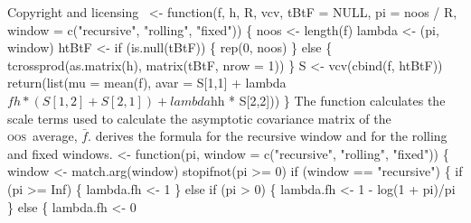 \documentclass[10pt]{article}%
\newcommand{\oos}{\textsc{oos}}
\begin{document}
\endmoddef\nwstartdeflinemarkup{}\nwenddeflinemarkup
\LA{}Copyright and licensing~{\nwtagstyle{}}\RA{}
 <- function(f, h, R, vcv, tBtF = NULL, pi = noos / R,
                            window = c("recursive", "rolling", "fixed")) \{
  noos <- length(f)
  lambda <- (pi, window)
  htBtF <- if (is.null(tBtF)) \{
    rep(0, noos) 
  \} else \{
    tcrossprod(as.matrix(h), matrix(tBtF, nrow = 1))
  \}
  S <- vcv(cbind(f, htBtF))
  return(list(mu = mean(f), avar = S[1,1] + lambda$fh * (S[1,2] + S[2,1]) 
                                   + lambda$hh * S[2,2]))
\}
\eatline
{}\nwendcode{}\nwdocspar
The function {\Tt{}\nwendquote} calculates the scale terms used to
calculate the asymptotic covariance matrix of the \oos\ average, $\bar
f$.  \citet{Wes:96} derives the formula for the recursive window and
\citet{WeM:98} for the rolling and fixed windows.
\nwenddocs{}\plusendmoddef\nwstartdeflinemarkup{}\nwenddeflinemarkup
{} <- function(pi, window = c("recursive", "rolling", "fixed")) \{
  window <- match.arg(window)
  stopifnot(pi >= 0)
  if (window == "recursive") \{
    if (pi >= Inf) \{
      lambda.fh <- 1
    \} else if (pi > 0) \{
      lambda.fh <- 1 - log(1 + pi)/pi
    \} else \{
      lambda.fh <- 0
\end{document}
